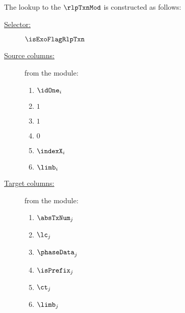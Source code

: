 The lookup to the $\rlpTxnMod$ is constructed as follows:
\begin{description}
	\item[\underline{Selector:}] $\isExoFlagRlpTxn$
	\item[\underline{Source columns:}] from the \mmioMod{} module:
		\begin{multicols}{3}
			\begin{enumerate}
				\item $\idOne_{i}$
				\item $1$
				\item $1$
				\item $0$
				\item $\indexX_{i}$
				\item $\limb_{i}$
			\end{enumerate}
		\end{multicols}
	\item[\underline{Target columns:}] from the \rlpTxnMod{} module: 
		\begin{multicols}{3}
			\begin{enumerate}
				\item $\absTxNum  _{j}$
				\item $\lc        _{j}$
				\item $\phaseData _{j}$
				\item $\isPrefix  _{j}$
				\item $\ct        _{j}$
				\item $\limb      _{j}$
			\end{enumerate}
		\end{multicols}
\end{description}
